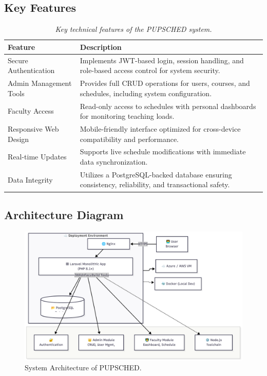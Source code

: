 \documentclass[12pt,letterpaper]{article}
\begin{document}
\subsection{Key Features}
\begin{table}[h] %
\centering
\renewcommand{\arraystretch}{1.3} %
\setlength{\tabcolsep}{25pt}      %
\begin{tabular}{|p{4cm}|p{9cm}|}
\hline
\textbf{Feature} & \textbf{Description} \\
\hline
Secure Authentication & Implements JWT-based login, session handling, and role-based access control for system security. \\
\hline
Admin Management Tools & Provides full CRUD operations for users, courses, and schedules, including system configuration. \\
\hline
Faculty Access & Read-only access to schedules with personal dashboards for monitoring teaching loads. \\
\hline
Responsive Web Design & Mobile-friendly interface optimized for cross-device compatibility and performance. \\
\hline
Real-time Updates & Supports live schedule modifications with immediate data synchronization. \\
\hline
Data Integrity & Utilizes a PostgreSQL-backed database ensuring consistency, reliability, and transactional safety. \\
\hline
\end{tabular}
\caption{\textit{Key technical features of the PUPSCHED system.}}
\end{table}



\vspace{4.5em} 

\subsection{Architecture Diagram}

\begin{figure}[h!]
    \centering
    \includegraphics[width=\textwidth]{assets/architecture_dia_pupsched.png}
    \caption{System Architecture of PUPSCHED.}
    \label{fig:architecture}
\end{figure}
\end{document}
